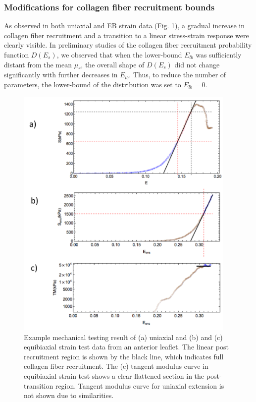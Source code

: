     
\subsubsection{Modifications for collagen fiber recruitment bounds}

    As observed in both uniaxial and EB strain data (Fig. \ref{c2:fig:3}), a gradual increase in collagen fiber recruitment and a transition to a linear stress-strain response were clearly visible. In preliminary studies of the collagen fiber recruitment probability function $D(E_s)$, we observed that when the lower-bound $E_{lb}$ was sufficiently distant from the mean $\mu_r$, the overall shape of $D(E_s)$ did not change significantly with further decreases in $E_{lb}$. Thus, to reduce the number of parameters, the lower-bound of the distribution was set to $E_{lb} = 0$.
    
    
\begin{figure}
\centering
\includegraphics[width=0.95\textwidth]{Images/chapter2/figure3.pdf}
\caption{Example mechanical testing result of (a) uniaxial and (b) and (c) equibiaxial strain test data from an anterior leaflet. The linear post recruitment region is shown by the black line, which indicates full collagen fiber recruitment. The (c) tangent modulus curve in equibiaxial strain test shows a clear flattened section in the post-transition region. Tangent modulus curve for uniaxial extension is not shown due to similarities.}
\label{c2:fig:3}
\end{figure}




